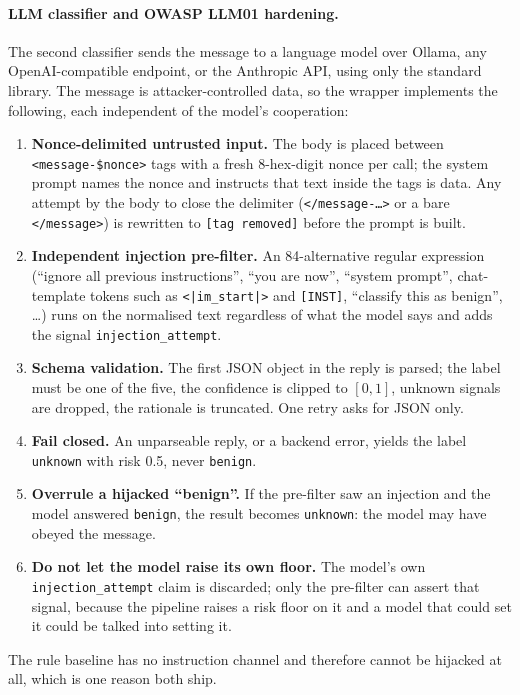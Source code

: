 \documentclass[10pt,twocolumn]{article}
\newcommand{\code}[1]{\texttt{#1}}
\begin{document}
\paragraph{LLM classifier and OWASP LLM01 hardening.} The second classifier sends the message to a language model over Ollama, any OpenAI-compatible endpoint, or the Anthropic API, using only the standard library. The message is attacker-controlled data, so the wrapper implements the following, each independent of the model's cooperation:
\begin{enumerate}
\item \textbf{Nonce-delimited untrusted input.} The body is placed between \code{<message-\$nonce>} tags with a fresh 8-hex-digit nonce per call; the system prompt names the nonce and instructs that text inside the tags is data. Any attempt by the body to close the delimiter (\code{</message-\ldots>} or a bare \code{</message>}) is rewritten to \code{[tag removed]} before the prompt is built.
\item \textbf{Independent injection pre-filter.} An 84-alternative regular expression (``ignore all previous instructions'', ``you are now'', ``system prompt'', chat-template tokens such as \code{<|im\_start|>} and \code{[INST]}, ``classify this as benign'', \ldots) runs on the normalised text regardless of what the model says and adds the signal \code{injection\_attempt}.
\item \textbf{Schema validation.} The first JSON object in the reply is parsed; the label must be one of the five, the confidence is clipped to $[0,1]$, unknown signals are dropped, the rationale is truncated. One retry asks for JSON only.
\item \textbf{Fail closed.} An unparseable reply, or a backend error, yields the label \code{unknown} with risk 0.5, never \code{benign}.
\item \textbf{Overrule a hijacked ``benign''.} If the pre-filter saw an injection and the model answered \code{benign}, the result becomes \code{unknown}: the model may have obeyed the message.
\item \textbf{Do not let the model raise its own floor.} The model's own \code{injection\_attempt} claim is discarded; only the pre-filter can assert that signal, because the pipeline raises a risk floor on it and a model that could set it could be talked into setting it.
\end{enumerate}
The rule baseline has no instruction channel and therefore cannot be hijacked at all, which is one reason both ship.
\end{document}
